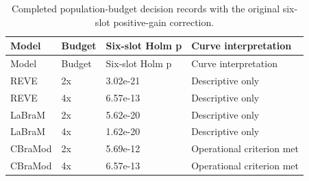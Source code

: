 \begin{longtable}{llll}
\caption{Completed population-budget decision records with the original six-slot positive-gain correction.}\label{tab:budget_decisions}\\
\toprule
Model & Budget & Six-slot Holm p & Curve interpretation \\
\midrule
\endfirsthead
\toprule
Model & Budget & Six-slot Holm p & Curve interpretation \\
\midrule
\endhead
REVE & 2x & 3.02e-21 & Descriptive only \\
REVE & 4x & 6.57e-13 & Descriptive only \\
LaBraM & 2x & 5.62e-20 & Descriptive only \\
LaBraM & 4x & 1.62e-20 & Descriptive only \\
CBraMod & 2x & 5.69e-12 & Operational criterion met \\
CBraMod & 4x & 6.57e-13 & Operational criterion met \\
\bottomrule
\end{longtable}
